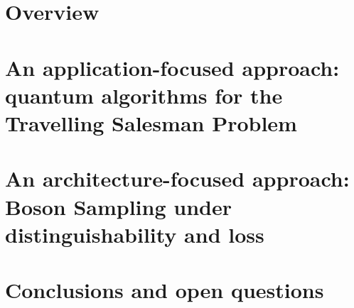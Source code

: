 \documentclass[ %
                    author={Alexandra Emily Moylett},
                supervisor={Dr. Peter S. Turner and Prof. Noah Linden},
                    degree={PhD},
                     title={Towards a Quantum Speedup via Applications and Architectures},
                  subtitle={},
                      year={March 2020},
                      length={43,000} ]{templates/thesis}
\begin{document}
\mainmatter


\part{Overview}

\part{An application-focused approach: quantum algorithms for the Travelling Salesman Problem}
\label{prt:application}


\part{An architecture-focused approach: Boson Sampling under distinguishability and loss}
\label{prt:architecture}



\part{Conclusions and open questions}



%
%

\backmatter





\appendix

\end{document}
